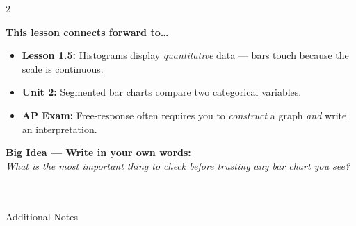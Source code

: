 \documentclass[10pt]{article}
\begin{document}
\vspace{0.1in}

\begin{spiralbox}
\small
\begin{multicols}{2}

\textbf{This lesson connects forward to\dots}
\begin{itemize}[itemsep=2pt]
  \item \textbf{Lesson 1.5:} Histograms display \textit{quantitative} data --- bars touch because the scale is continuous.
  \item \textbf{Unit 2:} Segmented bar charts compare two categorical variables.
  \item \textbf{AP Exam:} Free-response often requires you to \textit{construct} a graph \textit{and} write an interpretation.
\end{itemize}

\columnbreak

\textbf{Big Idea --- Write in your own words:}\\
\textit{What is the most important thing to check before trusting any bar chart you see?}\\[2pt]
\writeline\\[1pt]\writeline\\[1pt]\writeline

\end{multicols}
\end{spiralbox}

\vspace{0.1in}

\begin{notesbox}{Additional Notes}
\vspace{0pt}
\writeline\\\writeline\\\writeline\\\writeline\\\writeline\\\writeline
\end{notesbox}
\end{document}
